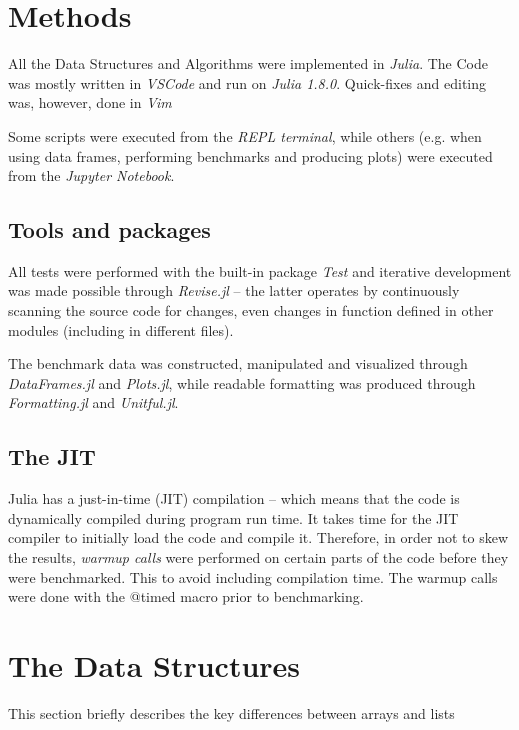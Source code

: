 \documentclass[a4paper, 11pt]{article}
\begin{document}
    \section*{Methods}
    All the Data Structures and Algorithms were implemented in \emph{Julia}.
    The Code was mostly written in \emph{VSCode} and run on \emph{Julia 1.8.0}.
    Quick-fixes and editing was, however, done in \emph{Vim}

    Some scripts were executed from the \emph{REPL terminal},  while others (e.g.
    when using data frames, performing benchmarks and producing plots) were executed from the
    \emph{Jupyter Notebook}. 
    
    \subsection*{Tools and packages}
    All tests were performed with the built-in package \emph{Test} and iterative development
    was made possible through \emph{Revise.jl} -- the latter operates by continuously
    scanning the source code for changes, even changes in function defined in
    other modules (including in different files).
    
    The benchmark data was constructed, manipulated and visualized through
    \emph{DataFrames.jl} and \emph{Plots.jl}, while 
    readable formatting was produced through \emph{Formatting.jl} and \emph{Unitful.jl}. 

    \subsection*{The JIT}
    Julia has a just-in-time (JIT) compilation -- which means that the code is
    dynamically compiled during program run time.     
    It takes time for the JIT compiler to 
    initially load the code and compile it. Therefore, in order not to skew the
    results, \emph{warmup calls} were performed on certain parts of the code
    before they were benchmarked. This to avoid including 
    compilation time. The warmup calls were done with the @timed macro prior to
    benchmarking.

\clearpage

    \section*{The Data Structures}
    This section briefly describes the key differences between arrays and lists 
\end{document}
